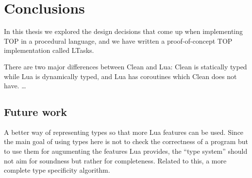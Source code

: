\chapter{Conclusions}\label{conclusions}

In this thesis we explored the design decisions that come up when implementing TOP in a procedural language, and we have written a proof-of-concept TOP implementation called LTasks.

There are two major differences between Clean and Lua: Clean is statically typed while Lua is dynamically typed, and Lua has coroutines which Clean does not have. \dots

\section{Future work}
A better way of representing types so that more Lua features can be used. Since the main goal of using types here is not to check the correctness of a program but to use them for augumenting the features Lua provides, the ``type system'' should not aim for soundness but rather for completeness.
Related to this, a more complete type specificity algorithm.

